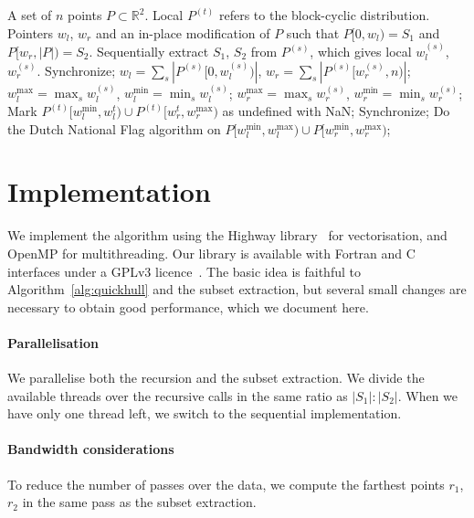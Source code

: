 \begin{algorithm}[ht]
  \begin{algorithmic}[1]
    \Require A set of $n$ points $P \subset \mathbb{R}^2$. Local $P^{(t)}$ refers to the block-cyclic distribution.
    \Ensure Pointers $w_l$, $w_r$ and an in-place modification of $P$ such that $P[0, w_l) = S_1$ and $P[w_r, |P|) = S_2$.
    \State Sequentially extract $S_1$, $S_2$ from $P^{(s)}$, which gives local $w_l^{(s)}$, $w_r^{(s)}$.
    \State Synchronize;
    \State $w_l = \sum_s |P^{(s)}[0, w_l^{(s)})|$,
           $w_r = \sum_s |P^{(s)}[w_r^{(s)}, n)|$;
    \State $w_l^{\max} = \max_s w_l^{(s)}$, $w_l^{\min} = \min_s w_l^{(s)}$;
    \State $w_r^{\max} = \max_s w_r^{(s)}$, $w_r^{\min} = \min_s w_r^{(s)}$;
    \State Mark $P^{(t)}[w_l^{\min}, w_l^{t}) \cup P^{(t)}[w_r^{t}, w_r^{\max})$ as undefined with NaN;
    \State Synchronize;
      \State Do the Dutch National Flag algorithm on $P[w_l^{\min}, w_l^{\max}) \cup P[w_r^{\min}, w_r^{\max})$;
    \EndIf
  \end{algorithmic}%
  \label{alg:par_subset}%
\end{algorithm}

\section{Implementation}\label{sec:impl}
We implement the algorithm using the Highway library~\cite{wassenberg2022vectorized} for vectorisation, and OpenMP for multithreading.
Our library is available with Fortran and C interfaces under a GPLv3 licence~\cite{vqhull2025repository}.
The basic idea is faithful to Algorithm~\ref{alg:quickhull} and the subset extraction, but several small changes are necessary to obtain good performance, which we document here.

\paragraph{Parallelisation}
We parallelise both the recursion and the subset extraction.
We divide the available threads over the recursive calls in the same ratio as $|S_1| : |S_2|$.
When we have only one thread left, we switch to the sequential implementation.

\paragraph{Bandwidth considerations}
To reduce the number of passes over the data, we compute the farthest points $r_1$, $r_2$ in the same pass as the subset extraction.

